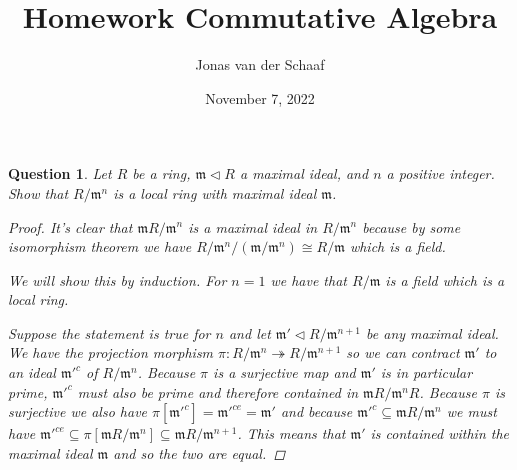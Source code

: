 \documentclass{article}
\title{Homework Commutative Algebra}
\author{Jonas van der Schaaf}
\date{November 7, 2022}
\newcommand{\maxid}{\mathfrak{m}}
\newcommand{\ideal}{\triangleleft}
\newtheorem{question}{Question}
\theoremstyle{definition}
\begin{document}
\maketitle

\begin{question}
    Let \(R\) be a ring, \(\maxid\ideal R\) a maximal ideal, and \(n\) a
    positive integer. Show that \(R/\maxid^{n}\) is a local ring with maximal
    ideal \(\maxid\).

    \begin{proof}
        It's clear that \(\maxid R/\maxid^{n}\) is a maximal ideal in
        \(R/\maxid^{n}\) because by some isomorphism theorem we have
        \(R/\maxid^{n}/(\maxid/\maxid^{n})\cong R/\maxid\) which is a field.

        We will show this by induction. For \(n=1\) we have that
        \(R/\maxid\) is a field which is a local ring.

        Suppose the statement is true for \(n\) and let \(\maxid'\ideal
        R/\maxid^{n+1}\) be any maximal ideal. We have the projection morphism
        \(\pi:R/\maxid^{n}\twoheadrightarrow R/\maxid^{n+1}\) so we can contract
        \(\maxid'\) to an ideal \(\maxid'^{c}\) of \(R/\maxid^{n}\). Because
        \(\pi\) is a surjective map and \(\maxid'\) is in particular prime,
        \(\maxid'^{c}\) must also be prime and therefore contained in \(\maxid
        R/\maxid^{n}R\). Because \(\pi\) is surjective we also have
        \(\pi[\maxid'^{c}]=\maxid'^{ce}=\maxid'\) and because
        \(\maxid'^{c}\subseteq\maxid R/\maxid^{n}\) we must have
        \(\maxid'^{ce}\subseteq\pi[\maxid R/\maxid^{n}]\subseteq\maxid
        R/\maxid^{n+1}\). This means that \(\maxid'\) is contained within the
        maximal ideal \(\maxid\) and so the two are equal.
    \end{proof}
\end{question}
\end{document}
